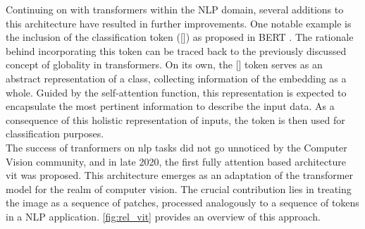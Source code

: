 \noindent Continuing on with transformers within the NLP domain, several additions 
to this architecture have resulted in further improvements. One notable example is the inclusion of 
the classification token ([]) as proposed in BERT \autocite{devlin2018bert}. The rationale 
behind incorporating this token can be traced back to the previously discussed concept of globality 
in transformers. On its own, the [] token serves as an abstract representation of a 
class, collecting information of the embedding as a whole. Guided by the 
self-attention function, this representation is expected to encapsulate the most pertinent 
information to describe the input data. As a consequence of this holistic representation of inputs, 
the token is then used for classification purposes.\\

\noindent The success of tranformers on \gls{nlp} tasks did not go unnoticed by the Computer Vision 
community, and in late 2020, the first fully attention based architecture \gls{vit} was proposed.
This architecture emerges as an adaptation of the transformer model for the realm of computer vision. 
The crucial contribution lies in treating the image as a sequence of patches, processed 
analogously to a sequence of tokens in a NLP application. \autoref{fig:rel_vit} provides an 
overview of this approach.\\

